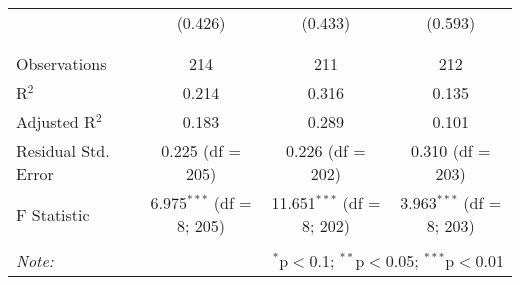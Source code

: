 \begin{table}[!htbp]
\begin{tabular}{@{\extracolsep{5pt}}lccc}
  & (0.426) & (0.433) & (0.593) \\ 
  & & & \\ 
\hline \\[-1.8ex] 
Observations & 214 & 211 & 212 \\ 
R$^{2}$ & 0.214 & 0.316 & 0.135 \\ 
Adjusted R$^{2}$ & 0.183 & 0.289 & 0.101 \\ 
Residual Std. Error & 0.225 (df = 205) & 0.226 (df = 202) & 0.310 (df = 203) \\ 
F Statistic & 6.975$^{***}$ (df = 8; 205) & 11.651$^{***}$ (df = 8; 202) & 3.963$^{***}$ (df = 8; 203) \\ 
\hline 
\hline \\[-1.8ex] 
\textit{Note:}  & \multicolumn{3}{r}{$^{*}$p$<$0.1; $^{**}$p$<$0.05; $^{***}$p$<$0.01} \\ 
\end{tabular} 
\end{table} 
